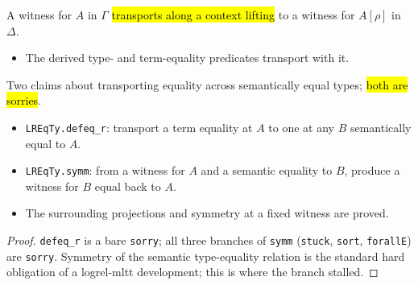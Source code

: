 \begin{definition}
\label{def:expa-lristype-weak}
\leanok
{}

 A witness for $A$ in $\Gamma$ \hl{transports along a context lifting} to a witness
for $A[\rho]$ in $\Delta$.
\begin{itemize}
\item The derived type- and term-equality predicates transport with it.
\end{itemize}
\end{definition}

\begin{lemma}
\label{thm:expa-lreqty-symm-hole}
\leanok
{}
 Two claims about transporting equality across semantically equal types; \hl{both are
sorries}.
\begin{itemize}
\item \texttt{LREqTy.defeq\_r}: transport a term equality at $A$ to one at any $B$ semantically equal
to $A$.
\item \texttt{LREqTy.symm}: from a witness for $A$ and a semantic equality to $B$, produce a witness
for $B$ equal back to $A$.
\item The surrounding projections and symmetry at a fixed witness are proved.
\end{itemize}
\end{lemma}
\begin{proof}
\stSorry{} \texttt{defeq\_r} is a bare \texttt{sorry}; all three branches of \texttt{symm}
(\texttt{stuck}, \texttt{sort}, \texttt{forallE}) are \texttt{sorry}. Symmetry of the semantic
type-equality relation is the standard hard obligation of a logrel-mltt development; this is where
the branch stalled.
\end{proof}

